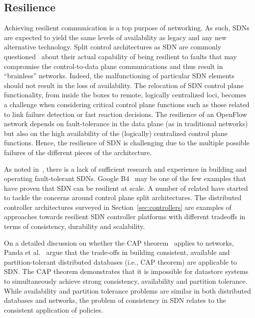 \subsection{Resilience}
\label{sec:resiliency}

Achieving resilient communication is a top purpose of networking.
As such, SDNs are expected to yield the same levels of availability as legacy and any new alternative technology. 
Split control architectures as SDN are commonly questioned~\cite{desai2010} about their
actual capability of being resilient to faults that may compromise
the control-to-data plane communications and thus result in
``brainless'' networks.
Indeed, the malfunctioning of particular SDN elements should not result in the loss
of availability. The relocation of SDN control plane functionality,
from inside the boxes to remote, logically centralized loci, becomes a
challenge when considering critical control plane functions such as
those related to link failure detection or fast reaction decisions.
The resilience of an OpenFlow network depends on fault-tolerance in the data plane (as in traditional networks) but also on the high availability of the (logically) centralized control plane functions. Hence, the resilience of SDN is challenging due to the multiple possible failures of the different pieces of the architecture. 

As noted in~\cite{kim2012}, there is a lack of sufficient research and experience in building and operating fault-tolerant SDNs.
Google B4~\cite{jain2013-1} may be one of the few examples that have proven that SDN can be resilient at scale. 
A number of related  have started to tackle the concerns around control plane split architectures. 
The distributed controller architectures surveyed in Section~\ref{sec:controllers} are examples of approaches towards resilient SDN controller platforms with different tradeoffs in terms of consistency, durability and scalability. 

On a detailed discussion on whether the CAP theorem~\cite{Brewer2012CAP} applies to networks, Panda et al.~\cite{panda2013} argue that the trade-offs in building consistent, available and
partition-tolerant distributed databases (i.e., CAP theorem) are applicable
to SDN. 
The CAP theorem demonstrates that it is impossible for
datastore systems to simultaneously achieve strong consistency,
availability and partition tolerance.
While availability and partition tolerance problems are similar in both distributed databases and networks, the problem of consistency in SDN relates to the consistent application of policies.

